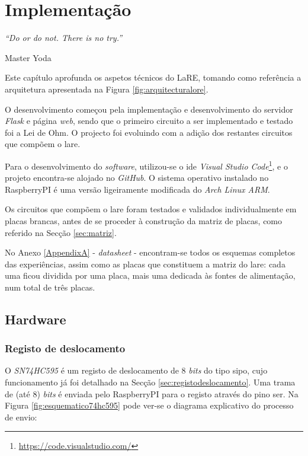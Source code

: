 \chapter{Implementação}
\label{Capítulo4}

\begin{center}
	\textit{``Do or do not. There is no try.''}

	Master Yoda
\end{center}
Este capítulo aprofunda os aspetos técnicos do LaRE, tomando como referência a arquitetura apresentada na Figura \ref{fig:arquitecturalore}.

O desenvolvimento começou pela implementação e desenvolvimento do servidor \textit{Flask} e página \textit{web}, sendo que o primeiro circuito a ser implementado e testado foi a Lei de Ohm. O projecto foi evoluindo com a adição dos restantes circuitos que compõem o \acrshort{lare}.

Para o desenvolvimento do \textit{software}, utilizou-se o \acrshort{ide} \textit{Visual Studio Code}\footnote{\url{https://code.visualstudio.com/}}, e o projeto encontra-se alojado no \textit{GitHub}. O sistema operativo instalado no \gls{RaspberryPI} é uma versão ligeiramente modificada do \textit{Arch Linux ARM}.

Os circuitos que compõem o \acrshort{lare} foram testados e validados individualmente em placas brancas, antes de se proceder à construção da matriz de placas, como referido na Secção \ref{sec:matriz}.

No Anexo \ref{AppendixA} - \textit{datasheet} - encontram-se todos os esquemas completos das experiências, assim como as placas que constituem a matriz do \acrshort{lare}: cada uma ficou dividida por uma placa, mais uma dedicada às fontes de alimentação, num total de três placas. 

\section{Hardware}
\subsection{Registo de deslocamento}
\label{sec:hwregistodeslocamento}
O \textit{SN74HC595} é um registo de deslocamento de 8 \textit{bits} do tipo \acrshort{sipo}, cujo funcionamento já foi detalhado na Secção \ref{sec:registodeslocamento}. Uma trama de (até 8) \textit{bits} é enviada pelo \gls{RaspberryPI} para o registo através do pino \acrshort{ser}. Na Figura \ref{fig:esquematico74hc595} pode ver-se o diagrama explicativo do processo de envio:


